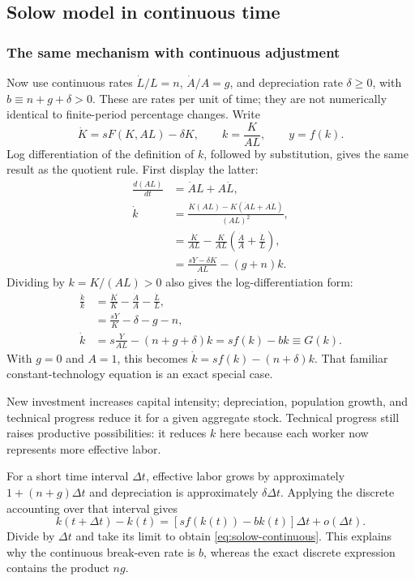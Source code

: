 \subsection{Solow model in continuous time}\label{solow-model-in-continuous-time}

\subsubsection{The same mechanism with continuous adjustment}

Now use continuous rates $\dot L/L=n$, $\dot A/A=g$, and depreciation rate
$\delta\geq0$, with $b\equiv n+g+\delta>0$. These are rates per unit of time;
they are not numerically identical to finite-period percentage changes. Write
\begin{equation}
\dot K=sF(K,AL)-\delta K,\qquad k=\frac{K}{AL},\qquad y=f(k).
\end{equation}
Log differentiation of the definition of $k$, followed by substitution, gives
the same result as the quotient rule. First display the latter:
\begin{align}
\frac{d(AL)}{dt}&=\dot A L+A\dot L,\\
\dot k&=\frac{\dot K(AL)-K(\dot A L+A\dot L)}{(AL)^2},\\
 &=\frac{\dot K}{AL}-\frac{K}{AL}
    \left(\frac{\dot A}{A}+\frac{\dot L}{L}\right),\\
 &=\frac{sY-\delta K}{AL}-(g+n)k.
\end{align}
Dividing by $k=K/(AL)>0$ also gives the log-differentiation form:
\begin{align}
\frac{\dot k}{k}
&=\frac{\dot K}{K}-\frac{\dot A}{A}-\frac{\dot L}{L},\\
&=\frac{sY}{K}-\delta-g-n,\\
\dot k&=s\frac{Y}{AL}-(n+g+\delta)k
       =sf(k)-bk\equiv G(k).\label{eq:solow-continuous}
\end{align}
With $g=0$ and $A=1$, this becomes $\dot k=sf(k)-(n+\delta)k$.
That familiar constant-technology equation is an exact special case.

New investment increases capital intensity; depreciation, population growth,
and technical progress reduce it for a given aggregate stock. Technical
progress still raises productive possibilities: it reduces $k$ here because
each worker now represents more effective labor.

For a short time interval $\Delta t$, effective labor grows by approximately
$1+(n+g)\Delta t$ and depreciation is approximately $\delta\Delta t$. Applying
the discrete accounting over that interval gives
\begin{equation}
k(t+\Delta t)-k(t)
=\left[sf(k(t))-bk(t)\right]\Delta t+o(\Delta t).
\end{equation}
Divide by $\Delta t$ and take its limit to obtain
\eqref{eq:solow-continuous}. This explains why the continuous break-even rate
is $b$, whereas the exact discrete expression contains the product $ng$.


